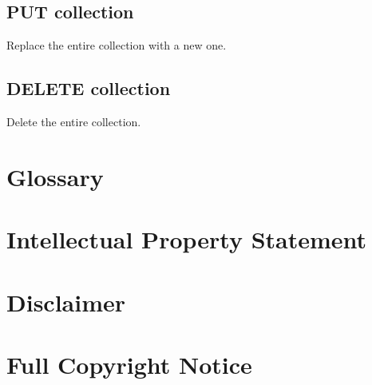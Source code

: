 \documentclass[10pt,a4paper]{article}
\begin{document}
\subsection{PUT collection}
Replace the entire collection with a new one. 

\subsection{DELETE collection}
Delete the entire collection. 

\begin{comment}
\section{More examples}
The OCCI demo instance of occi-py%
\footnote{\tt http://github.com/nyren/occi-py}
running at {\tt http://www.nyren.net/api/} has an early version of the draft
JSON rendering available.  Feel free to play around with it. However, please
note the following limitations:
\begin{itemize}
\item The Content-Type is {\tt application/json} and not {\tt application/occi+json}
which would be more appropriate.
\item It does not support request data in JSON.
\item Filtering and pagination is not yet supported.
\end{itemize}

A few example queries using curl:
\begin{verbatim}
curl -i -H 'accept: application/json' http://www.nyren.net/api/-/
curl -i -H 'accept: application/json' http://www.nyren.net/api/link/
curl -i -X POST -H 'accept: application/json' http://www.nyren.net/api/compute/
\end{verbatim}
\end{comment}

\section{Glossary}
\label{sec:glossary}


%

\section{Intellectual Property Statement}


\section{Disclaimer}


\section{Full Copyright Notice}




\end{document}

